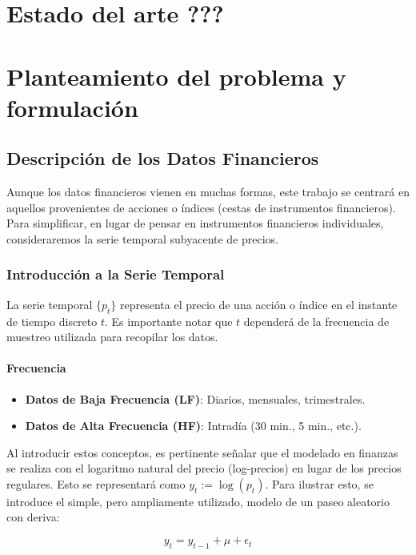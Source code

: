 \documentclass[a4paper,12pt]{report}
\begin{document}
\chapter{Estado del arte ???}

\chapter{Planteamiento del problema y formulación}
\section{Descripción de los Datos Financieros}

Aunque los datos financieros vienen en muchas formas, este trabajo se centrará en aquellos provenientes de acciones o índices 
(cestas de instrumentos financieros). Para simplificar, en lugar de pensar en instrumentos financieros individuales, consideraremos 
la serie temporal subyacente de precios.

\subsection{Introducción a la Serie Temporal}

La serie temporal $\{p_t\}$ representa el precio de una acción o índice en el instante de tiempo discreto $t$. Es importante 
notar que $t$ dependerá de la frecuencia de muestreo utilizada para recopilar los datos.

\subsubsection{Frecuencia}

\begin{itemize}
    \item \textbf{Datos de Baja Frecuencia (LF)}: Diarios, mensuales, trimestrales.
    \item \textbf{Datos de Alta Frecuencia (HF)}: Intradía (30 min., 5 min., etc.).
\end{itemize}

Al introducir estos conceptos, es pertinente señalar que el modelado en finanzas se realiza con el logaritmo natural del precio 
(log-precios) en lugar de los precios regulares. Esto se representará como $y_t := \log(p_t)$. Para ilustrar esto, se 
introduce el simple, pero ampliamente utilizado, modelo de un paseo aleatorio con deriva:

\[
y_t = y_{t-1} + \mu + \epsilon_t
\]
\end{document}
